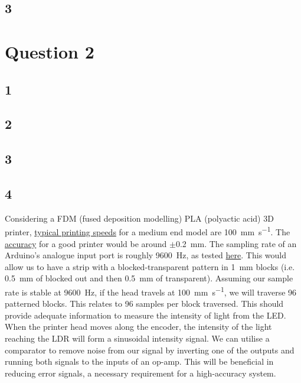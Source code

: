 \documentclass[11pt]{article}
\numberwithin{equation}{section}
\begin{document}
\subsection{3}
\section{Question 2}
\subsection{1}
\subsection{2}
\subsection{3}
\subsection{4}
Considering a FDM (fused deposition modelling) PLA (polyactic acid) 3D printer, \href{https://www.3dprintersonlinestore.com/how-to-obtain-best-3d-printing-speed}{typical printing speeds} for a medium end model are \SI{100}{\milli\meter\per\second}. The \href{https://all3dp.com/2/3d-printing-speed-optimal-settings/}{accuracy} for a good printer would be around $\pm$\SI{0.2}{\milli\meter}. The sampling rate of an Arduino's analogue input port is roughly \SI{9600}{\hertz}, as tested \href{http://yaab-arduino.blogspot.com/2015/02/fast-sampling-from-analog-input.html#:~:text=Arduino%20provides%20an%20convenient%20way,sampling%20rate%20of%209600%20Hz.}{here}. This would allow us to have a strip with a blocked-transparent pattern in \SI{1}{\milli\meter} blocks (i.e. \SI{0.5}{\milli\meter} of blocked out and then \SI{0.5}{\milli\meter} of transparent). Assuming our sample rate is stable at \SI{9600}{\hertz}, if the head travels at \SI{100}{\milli\meter\per\second}, we will traverse 96 patterned blocks. This relates to 96 samples per block traversed. This should provide adequate information to measure the intensity of light from the LED. When the printer head moves along the encoder, the intensity of the light reaching the LDR will form a sinusoidal intensity signal. We can utilise a comparator to remove noise from our signal by inverting one of the outputs and running both signals to the inputs of an op-amp. This will be beneficial in reducing error signals, a necessary requirement for a high-accuracy system. 
\end{document}
